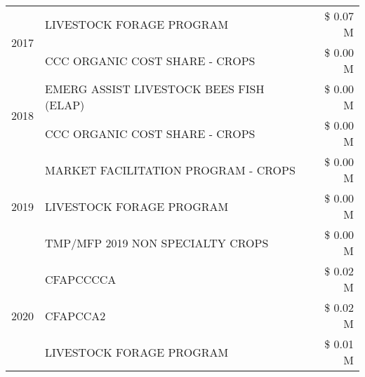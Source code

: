 \begin{tabular}{llr}
\cline{1-3}
\multirow[t]{2}{*}{2017} & LIVESTOCK FORAGE PROGRAM & \$ 0.07 M \\
 & CCC ORGANIC COST SHARE - CROPS & \$ 0.00 M \\
\cline{1-3}
\multirow[t]{2}{*}{2018} & EMERG ASSIST LIVESTOCK BEES FISH (ELAP) & \$ 0.00 M \\
 & CCC ORGANIC COST SHARE - CROPS & \$ 0.00 M \\
\cline{1-3}
\multirow[t]{3}{*}{2019} & MARKET FACILITATION PROGRAM - CROPS & \$ 0.00 M \\
 & LIVESTOCK FORAGE PROGRAM & \$ 0.00 M \\
 & TMP/MFP 2019 NON SPECIALTY CROPS & \$ 0.00 M \\
\cline{1-3}
\multirow[t]{3}{*}{2020} & CFAPCCCCA & \$ 0.02 M \\
 & CFAPCCA2 & \$ 0.02 M \\
 & LIVESTOCK FORAGE PROGRAM & \$ 0.01 M \\
\cline{1-3}
\bottomrule
\end{tabular}
